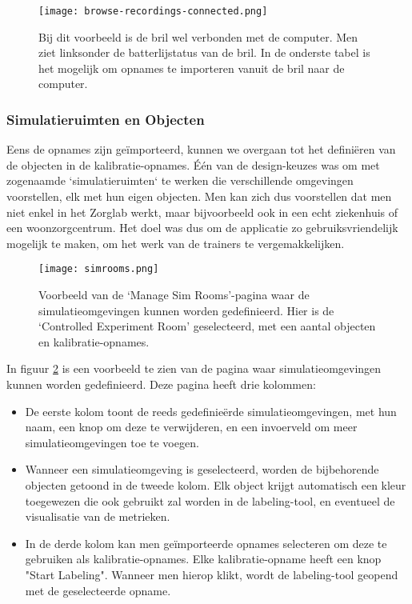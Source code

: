 \begin{figure}[H]
  \centering
  \texttt{[image: browse-recordings-connected.png]}
  \caption[]{\label{fig:browse-recordings-connected} Bij dit voorbeeld is de bril wel verbonden met de computer. Men ziet linksonder de batterlijstatus van de bril. In de onderste tabel is het mogelijk om opnames te importeren vanuit de bril naar de computer. }
\end{figure}

\subsubsection{Simulatieruimten en Objecten}

Eens de opnames zijn geïmporteerd, kunnen we overgaan tot het definiëren van de objecten in de kalibratie-opnames. Één van de design-keuzes was om met zogenaamde `simulatieruimten` te werken die verschillende omgevingen voorstellen, elk met hun eigen objecten.
Men kan zich dus voorstellen dat men niet enkel in het Zorglab werkt, maar bijvoorbeeld ook in een echt ziekenhuis of een woonzorgcentrum. Het doel was dus om de applicatie zo gebruiksvriendelijk mogelijk te maken, om het werk van de trainers te vergemakkelijken.

\begin{figure}[H]
  \centering
  \texttt{[image: simrooms.png]}
  \caption[]{\label{fig:simrooms} Voorbeeld van de `Manage Sim Rooms'-pagina waar de simulatieomgevingen kunnen worden gedefinieerd. Hier is de `Controlled Experiment Room' geselecteerd, met een aantal objecten en kalibratie-opnames. }
\end{figure}

In figuur \ref{fig:simrooms} is een voorbeeld te zien van de pagina waar simulatieomgevingen kunnen worden gedefinieerd. 
Deze pagina heeft drie kolommen:
\begin{itemize}
    \item De eerste kolom toont de reeds gedefinieërde simulatieomgevingen, met hun naam, een knop om deze te verwijderen, en een invoerveld om meer simulatieomgevingen toe te voegen.
    \item Wanneer een simulatieomgeving is geselecteerd, worden de bijbehorende objecten getoond in de tweede kolom. Elk object krijgt automatisch een kleur toegewezen die ook gebruikt zal worden in de labeling-tool, en eventueel de visualisatie van de metrieken.
    \item In de derde kolom kan men geïmporteerde opnames selecteren om deze te gebruiken als kalibratie-opnames. Elke kalibratie-opname heeft een knop "Start Labeling". Wanneer men hierop klikt, wordt de labeling-tool geopend met de geselecteerde opname.
\end{itemize}

